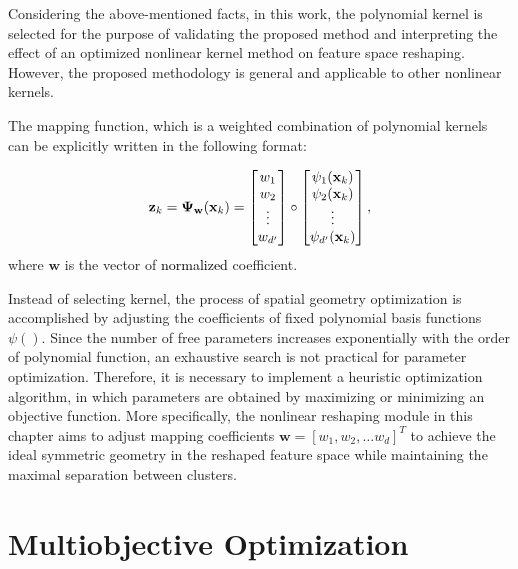 Considering the above-mentioned facts, in this work, the polynomial kernel is selected for the purpose of validating the proposed method and interpreting the effect of an optimized nonlinear kernel method on feature space reshaping. However, the proposed methodology is general and applicable to other nonlinear kernels.

The mapping function, which is a weighted combination of polynomial kernels can be explicitly written in the following format:

\begin{align}
\mathbf{z}_k
=\mathbf{\Psi_{w}} (\mathbf{x}_k) = 
\begin{bmatrix}
w_{1}  \\
w_{2}   \\
\vdots \\
w_{d^\prime} 
\end{bmatrix}
\circ
\begin{bmatrix}
\psi_1(\mathbf{x}_k)\\
\psi_2(\mathbf{x}_k)\\
\vdots\\
\psi_{d^\prime}(\mathbf{x}_k)
\end{bmatrix} \color{black}{,}
\label{eq:z}
\end{align}
where $\mathbf{w}$ is the vector of \textcolor{black}{normalized} coefficient.%

Instead of selecting kernel, %
the process of spatial geometry optimization is accomplished by adjusting the coefficients of fixed polynomial basis functions $\psi()$. Since the number of free parameters increases exponentially with the order of polynomial function, an exhaustive search is not practical for parameter optimization. Therefore, it is necessary to implement a heuristic optimization algorithm, in which parameters are obtained by maximizing or minimizing an objective function. More specifically, the nonlinear reshaping module in this chapter aims to adjust mapping coefficients  $\mathbf{w} = [w_1,w_2,\dots w_d]^T$ to achieve the ideal symmetric geometry in the reshaped feature space while maintaining the maximal separation between clusters.


\section{Multiobjective Optimization}

